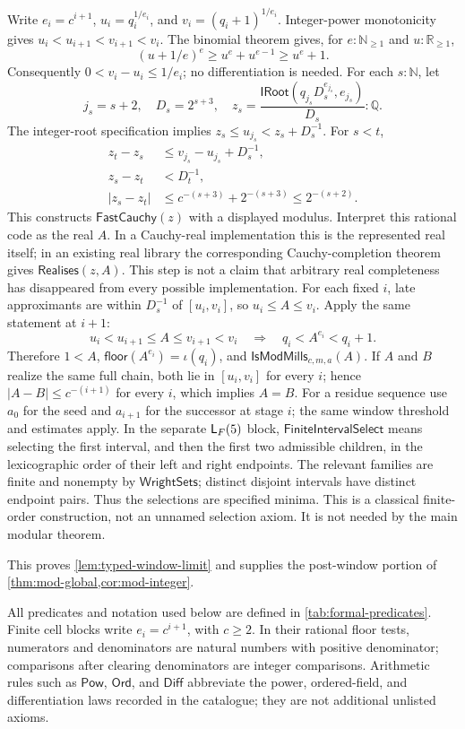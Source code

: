 \documentclass[11pt,reqno]{amsart}
\newcommand{\N}{\mathbb N}
\newcommand{\Q}{\mathbb Q}
\newcommand{\R}{\mathbb R}
\newcommand{\Np}{\N_{\ge1}}
\newcommand{\floor}{\textsf{floor}}
\theoremstyle{blueplain}
\newcounter{type}
\numberwithin{equation}{section}
\begin{document}
Write $e_i=c^{i+1}$, $u_i=q_i^{1/e_i}$, and
$v_i=(q_i+1)^{1/e_i}$. Integer-power monotonicity gives
$u_i<u_{i+1}<v_{i+1}<v_i$. The binomial theorem gives, for
$e:\Np$ and $u:\R_{\ge1}$,
\[
(u+1/e)^e\ge u^e+u^{e-1}\ge u^e+1.
\]
Consequently $0<v_i-u_i\le1/e_i$; no differentiation is needed.
For each $s:\N$, let
\[
j_s=s+2,\quad D_s=2^{s+3},\quad
z_s=\frac{\textsf{IRoot}(q_{j_s}D_s^{e_{j_s}},e_{j_s})}{D_s}:\Q.
\]
The integer-root specification implies
$z_s\le u_{j_s}<z_s+D_s^{-1}$. For $s<t$,
\[
\begin{aligned}
z_t-z_s&\le v_{j_s}-u_{j_s}+D_s^{-1},\\
z_s-z_t&<D_t^{-1},\\
|z_s-z_t|&\le c^{-(s+3)}+2^{-(s+3)}
\le2^{-(s+2)}.
\end{aligned}
\]
This constructs $\textsf{FastCauchy}(z)$ with a displayed modulus.
Interpret this rational code as the real $A$. In a Cauchy-real
implementation this is the represented real itself; in an existing real
library the corresponding Cauchy-completion theorem gives
$\textsf{Realises}(z,A)$. This step is not a claim that arbitrary real
completeness has disappeared from every possible implementation.
For each fixed $i$, late approximants are within $D_s^{-1}$ of
$[u_i,v_i]$, so $u_i\le A\le v_i$. Apply the same statement at $i+1$:
\[
u_i<u_{i+1}\le A\le v_{i+1}<v_i
\quad\Longrightarrow\quad q_i<A^{e_i}<q_i+1.
\]
Therefore $1<A$, $\floor(A^{e_i})=\iota(q_i)$, and
$\textsf{IsModMills}_{c,m,a}(A)$. If $A$ and $B$ realize the same full
chain, both lie in $[u_i,v_i]$ for every $i$; hence
$|A-B|\le c^{-(i+1)}$ for every $i$, which implies $A=B$.
For a residue sequence use $a_0$ for the seed and $a_{i+1}$ for the
successor at stage $i$; the same window threshold and estimates apply.
In the separate $\textsf L_F(5)$ block, $\textsf{FiniteIntervalSelect}$
means selecting the first interval, and then the first two admissible children,
in the lexicographic order of their left and right endpoints. The relevant
families are finite and nonempty by $\textsf{WrightSets}$; distinct disjoint
intervals have distinct endpoint pairs. Thus the selections are specified
minima. This is a classical finite-order construction, not an unnamed
selection axiom. It is not needed by the main modular theorem.

This proves \cref{lem:typed-window-limit} and supplies the post-window
portion of \cref{thm:mod-global,cor:mod-integer}.




All predicates and notation used below are defined in \cref{tab:formal-predicates}.
Finite cell blocks write \(e_i=c^{i+1}\), with \(c\ge2\).
In their rational floor tests, numerators and denominators are natural
numbers with positive denominator; comparisons after clearing denominators
are integer comparisons. Arithmetic rules such as \(\textsf{Pow}\),
\(\textsf{Ord}\), and \(\textsf{Diff}\) abbreviate the power,
ordered-field, and differentiation laws recorded in the catalogue;
they are not additional unlisted axioms.
\end{document}
